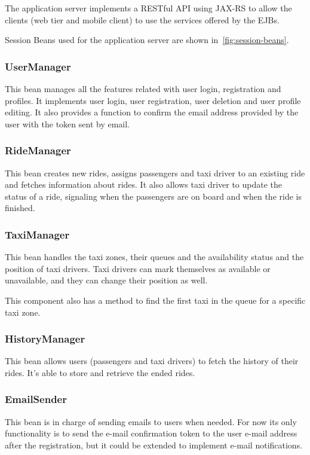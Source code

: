 The application server implements a RESTful API using JAX-RS to allow the clients (web tier and mobile client) to use the services offered by the EJBs.

Session Beans used for the application server are shown in~\autoref{fig:session-beans}.

\subsubsection{UserManager}
This bean manages all the features related with user login, registration and profiles.
It implements user login, user registration, user deletion and user profile editing.
It also provides a function to confirm the email address provided by the user with the token sent by email.

\subsubsection{RideManager}
This bean creates new rides, assigns passengers and taxi driver to an existing ride and fetches information about rides.
It also allows taxi driver to update the status of a ride, signaling when the passengers are on board and when the ride is finished.

\subsubsection{TaxiManager}
This bean handles the taxi zones, their queues and the availability status and the position of taxi drivers.
Taxi drivers can mark themselves as available or unavailable, and they can change their position as well.

This component also has a method to find the first taxi in the queue for a specific taxi zone.

\subsubsection{HistoryManager}
This bean allows users (passengers and taxi drivers) to fetch the history of their rides.
It's able to store and retrieve the ended rides.

\subsubsection{EmailSender}
This bean is in charge of sending emails to users when needed. For now its only functionality is to send the e-mail confirmation token to the user e-mail address after the registration, but it could be extended to implement e-mail notifications.

